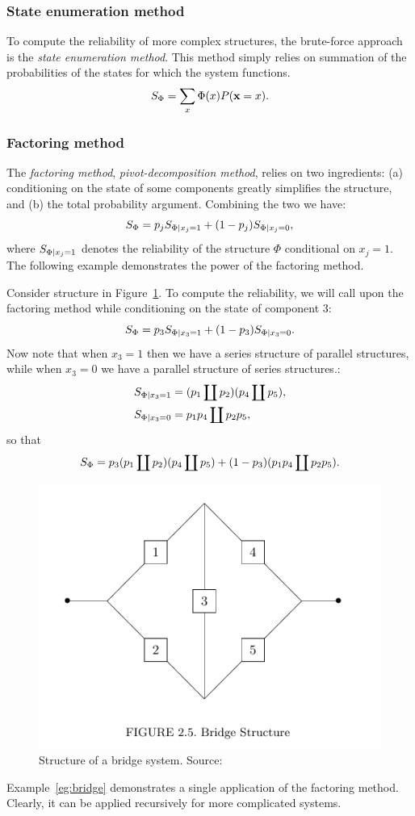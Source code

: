 \subsubsection{State enumeration method}
To compute the reliability of more complex structures, the brute-force approach is the \emph{state enumeration method}. 
This method simply relies on summation of the probabilities of the states for which the system functions.
$$ S_\Phi= \sum_{x} \Phi(x) P(\mathbf{x}=x).$$


\subsubsection{Factoring method}
The \emph{factoring method}, \aka \emph{pivot-decomposition method}, relies on two ingredients: 
(a) conditioning on the state of some components greatly simplifies the structure, and
(b) the total probability argument.
Combining the two we have:
$$ S_\Phi= p_j  S_{\Phi|x_j=1} + (1-p_j) S_{\Phi|x_j=0}   ,$$
where $S_{\Phi|x_j=1}$ denotes the reliability of the structure $\Phi$ conditional on $x_j=1$.
The following example demonstrates the power of the factoring method.

\begin{example}
\label{eg:bridge}
Consider structure in Figure~\ref{fig:bridge}.
To compute the reliability, we will call upon the factoring method while conditioning on the state of component $3$:
$$ S_\Phi= p_3  S_{\Phi|x_3=1} + (1-p_3) S_{\Phi|x_3=0}   .$$
Now note that when $x_3=1$ then we have a series structure of parallel structures, while when $x_3=0$ we have a parallel structure of series structures.:
\begin{align*}
	S_{\Phi|x_3=1} &= (p_1 \coprod p_2) (p_4 \coprod p_5),\\
	S_{\Phi|x_3=0} &=  p_1 p_4 \coprod p_2 p_5,
\end{align*}
so that 
$$ 	
	S_\Phi = p_3  (p_1 \coprod p_2) (p_4 \coprod p_5) + (1-p_3) (p_1 p_4 \coprod p_2 p_5).
$$
\begin{figure}[ht]
\centering
\includegraphics[width=0.5\linewidth]{art/bridge}
\caption[Bridge Structure]{Structure of a bridge system. Source: \cite[Fig.2.5]{aven_stochastic_1999}}
\label{fig:bridge}
\end{figure}
\end{example}
Example~\ref{eg:bridge} demonstrates a single application of the factoring method. Clearly, it can be applied recursively for more complicated systems.

